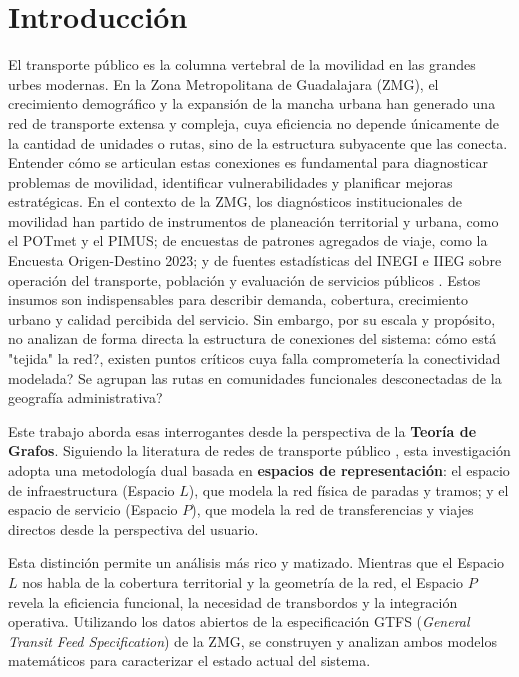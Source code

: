 \chapter*{Introducción}

El transporte público es la columna vertebral de la movilidad en las grandes urbes modernas. En la Zona Metropolitana de Guadalajara (ZMG), el crecimiento demográfico y la expansión de la mancha urbana han generado una red de transporte extensa y compleja, cuya eficiencia no depende únicamente de la cantidad de unidades o rutas, sino de la estructura subyacente que las conecta. Entender cómo se articulan estas conexiones es fundamental para diagnosticar problemas de movilidad, identificar vulnerabilidades y planificar mejoras estratégicas. En el contexto de la ZMG, los diagnósticos institucionales de movilidad han partido de instrumentos de planeación territorial y urbana, como el POTmet y el PIMUS; de encuestas de patrones agregados de viaje, como la Encuesta Origen-Destino 2023; y de fuentes estadísticas del INEGI e IIEG sobre operación del transporte, población y evaluación de servicios públicos \cite{imeplan_potmet2024, imeplan_pimus2024, imeplan_eod2023, inegi2024, inegi_censo2020, inegi_encig2023, iieg2024}. Estos insumos son indispensables para describir demanda, cobertura, crecimiento urbano y calidad percibida del servicio. Sin embargo, por su escala y propósito, no analizan de forma directa la estructura de conexiones del sistema: \invquestion{}cómo está "tejida" la red?, \invquestion{}existen puntos críticos cuya falla comprometería la conectividad modelada? \invquestion{}Se agrupan las rutas en comunidades funcionales desconectadas de la geografía administrativa?

Este trabajo aborda esas interrogantes desde la perspectiva de la \textbf{Teoría de Grafos}. Siguiendo la literatura de redes de transporte público \cite{vanferber2009, dingluo2019}, esta investigación adopta una metodología dual basada en \textbf{espacios de representación}: el espacio de infraestructura (Espacio $L$), que modela la red física de paradas y tramos; y el espacio de servicio (Espacio $P$), que modela la red de transferencias y viajes directos desde la perspectiva del usuario.

Esta distinción permite un análisis más rico y matizado. Mientras que el Espacio $L$ nos habla de la cobertura territorial y la geometría de la red, el Espacio $P$ revela la eficiencia funcional, la necesidad de transbordos y la integración operativa. Utilizando los datos abiertos de la especificación GTFS (\textit{General Transit Feed Specification}) de la ZMG, se construyen y analizan ambos modelos matemáticos para caracterizar el estado actual del sistema.


